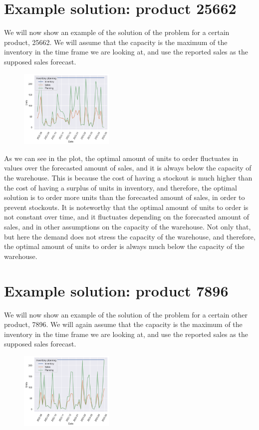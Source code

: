 \documentclass{OptiFlow}
\begin{document}
\section{Example solution: product 25662}
We will now show an example of the solution of the problem for a certain product, 25662.
We will assume that the capacity is the maximum of the inventory in the time frame we are looking at, and use the reported sales 
as the supposed sales forecast.

\begin{figure}[htpb]
	\centering
	\includegraphics[width=0.4\textwidth]{25662.png}
	\label{fig:graf1}
\end{figure}

As we can see in the plot, the optimal amount of units to order 
fluctuates in values over the forecasted amount of sales, and it is always below the capacity of the warehouse.
This is because the cost of having a stockout is much higher than the cost of having a surplus of units in inventory,
and therefore, the optimal solution is to order more units than the forecasted amount of sales, in order to prevent stockouts.
It is noteworthy that the optimal amount of units to order is not constant over time, and it fluctuates depending on the
forecasted amount of sales, and in other assumptions on the capacity of the warehouse. Not only that,
but here the demand does not stress the capacity of the warehouse, and therefore, the optimal amount of units to order is always much below the capacity of the warehouse.

\section{Example solution: product 7896}
We will now show an example of the solution of the problem for a certain other product, 7896.
We will again assume that the capacity is the maximum of the inventory in the time frame we are looking at, and use the reported sales 
as the supposed sales forecast.

\begin{figure}[htpb]
	\centering
	\includegraphics[width=0.4\textwidth]{7896.png}
	\label{fig:graf2}
\end{figure}
\end{document}
